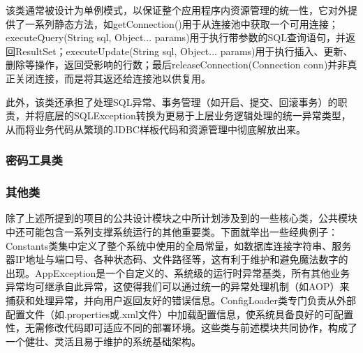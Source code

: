 该类通常被设计为单例模式，以保证整个应用程序内资源管理的统一性，它对外提供了一系列静态方法，如getConnection()用于从连接池中获取一个可用连接；executeQuery(String sql, Object... params)用于执行带参数的SQL查询语句，并返回ResultSet；executeUpdate(String sql, Object... params)用于执行插入、更新、删除等操作，返回受影响的行数；最后releaseConnection(Connection conn)并非真正关闭连接，而是将其返还给连接池以供复用。

此外，该类还承担了处理SQL异常、事务管理（如开启、提交、回滚事务）的职责，并将底层的SQLException转换为更易于上层业务逻辑处理的统一异常类型，从而将业务代码从繁琐的JDBC样板代码和资源管理中彻底解放出来。
\subsubsection{密码工具类}
\subsubsection{其他类}
除了上述所提到的项目的公共设计模块之中所计划涉及到的一些核心类，公共模块中还可能包含一系列支撑系统运行的其他重要类。下面就举出一些经典例子：Constants类集中定义了整个系统中使用的全局常量，如数据库连接字符串、服务器IP地址与端口号、各种状态码、文件路径等，这有利于维护和避免魔法数字的出现。AppException是一个自定义的、系统级的运行时异常基类，所有其他业务异常均可继承自此异常，这使得我们可以通过统一的异常处理机制（如AOP）来捕获和处理异常，并向用户返回友好的错误信息。ConfigLoader类专门负责从外部配置文件（如.properties或.xml文件）中加载配置信息，使系统具备良好的可配置性，无需修改代码即可适应不同的部署环境。这些类与前述模块共同协作，构成了一个健壮、灵活且易于维护的系统基础架构。

